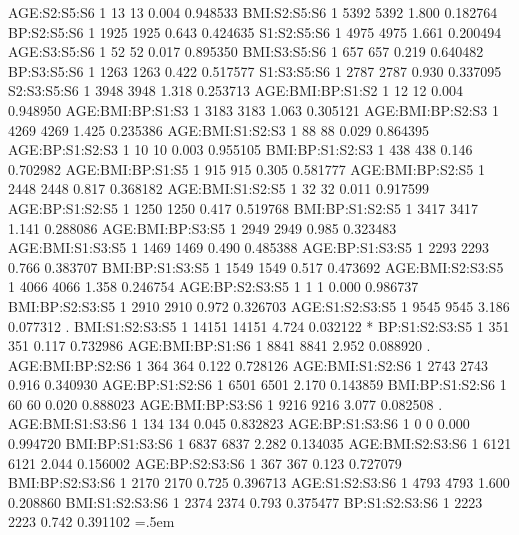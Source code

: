 \documentclass[runningheads]{llncs}
\newenvironment{lcverbatim}
 {\SaveVerbatim{cverb}}
 {\endSaveVerbatim
  \flushleft\fboxrule=0pt\fboxsep=.5em
  \colorbox{cverbbg}{%
    \makebox[\dimexpr\linewidth-2\fboxsep][l]{\BUseVerbatim{cverb}}%
  }
  \endflushleft
}
\begin{document}
\begin{lcverbatim}
AGE:S2:S5:S6            1     13      13   0.004 0.948533    
BMI:S2:S5:S6            1   5392    5392   1.800 0.182764    
BP:S2:S5:S6             1   1925    1925   0.643 0.424635    
S1:S2:S5:S6             1   4975    4975   1.661 0.200494    
AGE:S3:S5:S6            1     52      52   0.017 0.895350    
BMI:S3:S5:S6            1    657     657   0.219 0.640482    
BP:S3:S5:S6             1   1263    1263   0.422 0.517577    
S1:S3:S5:S6             1   2787    2787   0.930 0.337095    
S2:S3:S5:S6             1   3948    3948   1.318 0.253713    
AGE:BMI:BP:S1:S2        1     12      12   0.004 0.948950    
AGE:BMI:BP:S1:S3        1   3183    3183   1.063 0.305121    
AGE:BMI:BP:S2:S3        1   4269    4269   1.425 0.235386    
AGE:BMI:S1:S2:S3        1     88      88   0.029 0.864395    
AGE:BP:S1:S2:S3         1     10      10   0.003 0.955105    
BMI:BP:S1:S2:S3         1    438     438   0.146 0.702982    
AGE:BMI:BP:S1:S5        1    915     915   0.305 0.581777    
AGE:BMI:BP:S2:S5        1   2448    2448   0.817 0.368182    
AGE:BMI:S1:S2:S5        1     32      32   0.011 0.917599    
AGE:BP:S1:S2:S5         1   1250    1250   0.417 0.519768    
BMI:BP:S1:S2:S5         1   3417    3417   1.141 0.288086    
AGE:BMI:BP:S3:S5        1   2949    2949   0.985 0.323483    
AGE:BMI:S1:S3:S5        1   1469    1469   0.490 0.485388    
AGE:BP:S1:S3:S5         1   2293    2293   0.766 0.383707    
BMI:BP:S1:S3:S5         1   1549    1549   0.517 0.473692    
AGE:BMI:S2:S3:S5        1   4066    4066   1.358 0.246754    
AGE:BP:S2:S3:S5         1      1       1   0.000 0.986737    
BMI:BP:S2:S3:S5         1   2910    2910   0.972 0.326703    
AGE:S1:S2:S3:S5         1   9545    9545   3.186 0.077312 .  
BMI:S1:S2:S3:S5         1  14151   14151   4.724 0.032122 *  
BP:S1:S2:S3:S5          1    351     351   0.117 0.732986    
AGE:BMI:BP:S1:S6        1   8841    8841   2.952 0.088920 .  
AGE:BMI:BP:S2:S6        1    364     364   0.122 0.728126    
AGE:BMI:S1:S2:S6        1   2743    2743   0.916 0.340930    
AGE:BP:S1:S2:S6         1   6501    6501   2.170 0.143859    
BMI:BP:S1:S2:S6         1     60      60   0.020 0.888023    
AGE:BMI:BP:S3:S6        1   9216    9216   3.077 0.082508 .  
AGE:BMI:S1:S3:S6        1    134     134   0.045 0.832823    
AGE:BP:S1:S3:S6         1      0       0   0.000 0.994720    
BMI:BP:S1:S3:S6         1   6837    6837   2.282 0.134035    
AGE:BMI:S2:S3:S6        1   6121    6121   2.044 0.156002    
AGE:BP:S2:S3:S6         1    367     367   0.123 0.727079    
BMI:BP:S2:S3:S6         1   2170    2170   0.725 0.396713    
AGE:S1:S2:S3:S6         1   4793    4793   1.600 0.208860    
BMI:S1:S2:S3:S6         1   2374    2374   0.793 0.375477    
BP:S1:S2:S3:S6          1   2223    2223   0.742 0.391102    
\end{lcverbatim}
\end{document}
